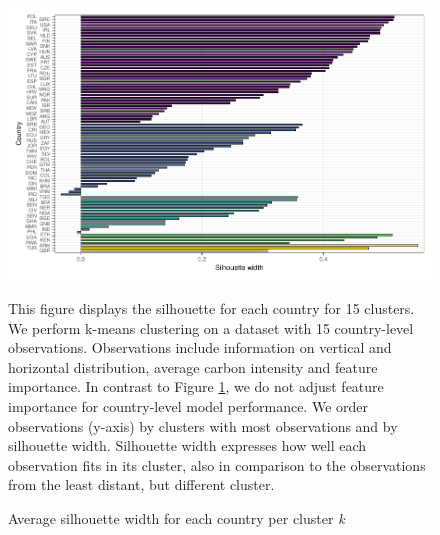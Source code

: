 \documentclass[12pt, a4paper]{article}
\newenvironment{subcaption}
{\strut
\vspace{-5pt}
\begin{minipage}[b]{0.9\textwidth}
  \hspace*{-\parindent}
  \footnotesize}
 {\end{minipage}}
\begin{document}
 \begin{figure}[ht!]
   \centering
   \caption{Average silhouette width for each country per cluster \textit{k}} \label{fig:G2_silhouette}
   \includegraphics{Figures_Appendix/Figure_Silhouette_Clusters_1}
   \begin{subcaption}
     This figure displays the silhouette for each country for 15 clusters. We perform k-means clustering on a dataset with 15 country-level observations. Observations include information on vertical and horizontal distribution, average carbon intensity and feature importance. In contrast to Figure \ref{fig:G2_silhouette}, we do not adjust feature importance for country-level model performance. We order observations (y-axis) by clusters with most observations and by silhouette width. Silhouette width expresses how well each observation fits in its cluster, also in comparison to the observations from the least distant, but different cluster.
   \end{subcaption}
 \end{figure}

 \clearpage
\end{document}
